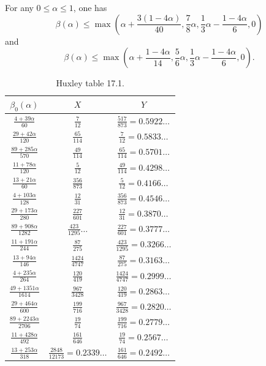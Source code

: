\begin{theorem}\label{sargos_1995}\cite[Th\'eor\`eme 2.4, Lemme 2.6]{sargos_points_1995}  For any $0 \leq \alpha \leq 1$, one has
$$ \beta(\alpha) \leq \max(\alpha + \frac{3(1-4\alpha)}{40}, \frac{7}{8} \alpha, \frac{1}{3}\alpha - \frac{1-4\alpha}{6}, 0)$$
and
$$ \beta(\alpha) \leq \max(\alpha + \frac{1-4\alpha}{14}, \frac{5}{6} \alpha, \frac{1}{3}\alpha - \frac{1-4\alpha}{6}, 0).$$
\end{theorem}

\literature
{}

\begin{table}[ht]
    \caption{Huxley table 17.1.}
    \centering
    \renewcommand{\arraystretch}{1.2}
    \begin{tabular}{|c|c|c|}
    \hline
    $\beta_0(\alpha)$  & $X$ & $Y$ \\
    \hline
    $\frac{4+39\alpha}{60}$ & $\frac{7}{12}$ & $\frac{517}{873} = 0.5922\dots$ \\
    \hline
    $\frac{29+42\alpha}{120}$ & $\frac{65}{114}$ & $\frac{7}{12} = 0.5833\dots$ \\
    \hline
    $\frac{89+285\alpha}{570}$ & $\frac{49}{114}$ & $\frac{65}{114} = 0.5701\dots$ \\
    \hline
    $\frac{11+78\alpha}{120}$ & $\frac{5}{12}$ & $\frac{49}{114} = 0.4298\dots$ \\
    \hline
    $\frac{13+21\alpha}{60}$ & $\frac{356}{873}$ & $\frac{5}{12} = 0.4166\dots$ \\
    \hline
    $\frac{4+103\alpha}{128}$ & $\frac{12}{31}$ & $\frac{356}{873} = 0.4546\dots$ \\
    \hline
    $\frac{29+173\alpha}{280}$ & $\frac{227}{601}$ & $\frac{12}{31} = 0.3870\dots$ \\
    \hline
    $\frac{89+908\alpha}{1282}$ & $\frac{423}{1295}\dots$ & $\frac{227}{601} = 0.3777\dots$ \\
    \hline
    $\frac{11+191\alpha}{244}$ & $\frac{87}{275}$ & $\frac{423}{1295} = 0.3266\dots$ \\
    \hline
    $\frac{13+94\alpha}{146}$ & $\frac{1424}{4747}$ & $\frac{87}{275} = 0.3163\dots$\\
    \hline
    $\frac{4+235\alpha}{264}$ & $\frac{120}{419}$ & $\frac{1424}{4747}=0.2999\dots$ \\
    \hline
    $\frac{49+1351\alpha}{1614}$ & $\frac{967}{3428}$ & $\frac{120}{419} = 0.2863\dots$ \\
    \hline
    $\frac{29+464\alpha}{600}$ & $\frac{199}{716}$ & $\frac{967}{3428} = 0.2820\dots$ \\
    \hline
    $\frac{89+2243\alpha}{2706}$ & $\frac{19}{74}$ & $\frac{199}{716} = 0.2779\dots$ \\
    \hline
    $\frac{11+428\alpha}{492}$ & $\frac{161}{646}$ & $\frac{19}{74} = 0.2567\dots$ \\
    \hline
    $\frac{13+253\alpha}{318}$ & $\frac{2848}{12173} =0.2339\dots$ & $\frac{161}{646} = 0.2492\dots$ \\
    \hline
    \end{tabular}
    \end{table}\label{huxley-table-1}

